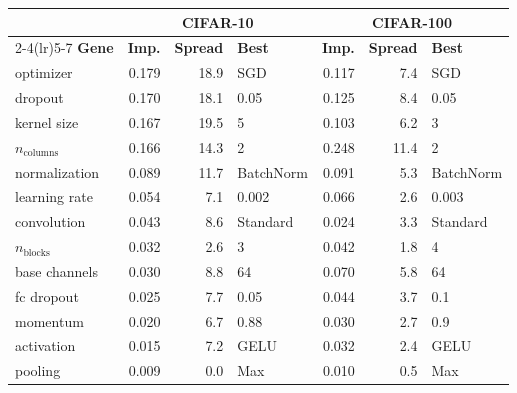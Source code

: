 \begin{tabular}{l rr l rr l}
\toprule
& \multicolumn{3}{c}{CIFAR-10} & \multicolumn{3}{c}{CIFAR-100} \\
\cmidrule(lr){2-4}\cmidrule(lr){5-7}
\textbf{Gene} & \textbf{Imp.} & \textbf{Spread} & \textbf{Best} & \textbf{Imp.} & \textbf{Spread} & \textbf{Best} \\
\midrule
optimizer & 0.179 & 18.9 & SGD & 0.117 & 7.4 & SGD \\
dropout & 0.170 & 18.1 & 0.05 & 0.125 & 8.4 & 0.05 \\
kernel size & 0.167 & 19.5 & 5 & 0.103 & 6.2 & 3 \\
$n_\text{columns}$ & 0.166 & 14.3 & 2 & 0.248 & 11.4 & 2 \\
normalization & 0.089 & 11.7 & BatchNorm & 0.091 & 5.3 & BatchNorm \\
learning rate & 0.054 & 7.1 & 0.002 & 0.066 & 2.6 & 0.003 \\
convolution & 0.043 & 8.6 & Standard & 0.024 & 3.3 & Standard \\
$n_\text{blocks}$ & 0.032 & 2.6 & 3 & 0.042 & 1.8 & 4 \\
base channels & 0.030 & 8.8 & 64 & 0.070 & 5.8 & 64 \\
fc dropout & 0.025 & 7.7 & 0.05 & 0.044 & 3.7 & 0.1 \\
momentum & 0.020 & 6.7 & 0.88 & 0.030 & 2.7 & 0.9 \\
activation & 0.015 & 7.2 & GELU & 0.032 & 2.4 & GELU \\
pooling & 0.009 & 0.0 & Max & 0.010 & 0.5 & Max \\
\bottomrule
\end{tabular}
